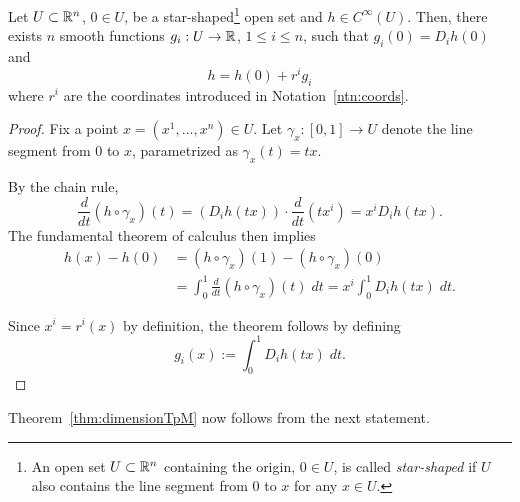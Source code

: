 \begin{lemma}\label{lem:Taylor}
  Let $U\subset\mathbb{R}^n$, $0\in U$, be a star-shaped\footnote{An open set $U\subset\mathbb{R}^n$ containing the origin, $0\in U$, is called \emph{star-shaped} if $U$ also contains the line segment from $0$ to $x$ for any $x\in U$.} open set and $h\in C^\infty(U)$.
  Then, there exists $n$ smooth functions $g_i: U \to \mathbb{R}$, $1\leq i \leq n$, such that $g_i(0) = D_i h(0)$ and
  \begin{equation}
    h = h(0) + r^i g_i
  \end{equation}
  where $r^i$ are the coordinates introduced in Notation~\ref{ntn:coords}.
\end{lemma}
\begin{proof}
  Fix a point $x = (x^1, \ldots, x^n) \in U$.
  Let $\gamma_x:[0,1]\to U$ denote the line segment from $0$ to $x$, parametrized as $\gamma_x(t) = tx$.

  By the chain rule,
  \begin{equation}
    \frac{d}{dt}(h \circ \gamma_x) (t) = \left(D_i h(t x)\right) \cdot \frac{d}{dt} (t x^i) = x^i D_i h(t x).
  \end{equation}
  The fundamental theorem of calculus then implies
  \begin{align}
    h(x) - h(0) &= (h \circ \gamma_x)(1) - (h \circ \gamma_x)(0) \\
    &= \int_0^1 \frac{d}{dt}(h \circ \gamma_x)(t)\;dt = x^i \int_0^1 D_i h(tx)\; dt.
  \end{align}

  Since $x^i = r^i(x)$ by definition, the theorem follows by defining
  \begin{equation}
    g_i(x) := \int_0^1 D_i h(tx)\; dt.
  \end{equation}
\end{proof}

Theorem~\ref{thm:dimensionTpM} now follows from the next statement.

